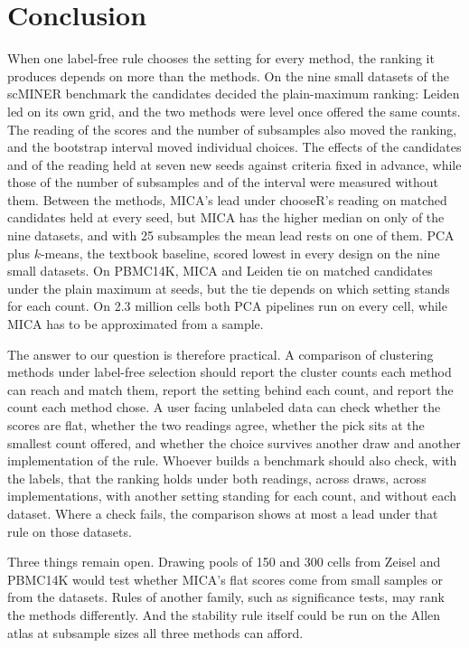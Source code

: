 \section{Conclusion}\label{sec:conclusion}
When one label-free rule chooses the setting for every method, the ranking it produces depends on more
than the methods. On the nine small datasets of the scMINER benchmark the candidates decided the
plain-maximum ranking: Leiden led on its own grid, and the two methods were level once offered the same
counts. The reading of the scores and the number of subsamples also moved the ranking, and the bootstrap
interval moved individual choices. The effects of the candidates and of the reading held at seven new seeds
against criteria fixed in advance, while those of the number of subsamples and of the interval were
measured without them. Between the methods, MICA's lead under chooseR's reading on matched candidates held
at every seed, but MICA has the higher median on only  of the nine datasets, and
with 25 subsamples the mean lead rests on one of them. PCA plus $k$-means,
the textbook baseline, scored lowest in every design on the nine small datasets. On PBMC14K, MICA and
Leiden tie on matched candidates under the plain maximum at  seeds, but the tie depends on which
setting stands for each count. On 2.3 million cells both PCA pipelines run on every cell, while MICA has
to be approximated from a sample.

The answer to our question is therefore practical. A comparison of clustering methods under label-free
selection should report the cluster counts each method can reach and match them, report the setting
behind each count, and report the count each method chose. A user facing unlabeled data can check whether
the scores are flat, whether the two readings agree, whether the pick sits at the smallest count offered, and
whether the choice survives another draw and another implementation of the rule. Whoever builds a
benchmark should also check, with the labels, that the ranking holds under both readings, across draws,
across implementations, with another setting standing for each count, and without each dataset. Where a check fails, the comparison shows at most a lead
under that rule on those datasets.

Three things remain open. Drawing pools of 150 and 300 cells from Zeisel and PBMC14K would test whether
MICA's flat scores come from small samples or from the datasets. Rules of another family, such as
significance tests, may rank the methods differently. And the stability rule itself could be run on the
Allen atlas at subsample sizes all three methods can afford.


